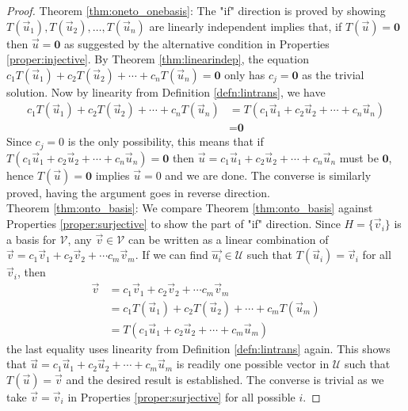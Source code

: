 \begin{proof}
Theorem \ref{thm:oneto_onebasis}: The "if" direction is proved by showing $T(\vec{u}_1), T(\vec{u}_2), \ldots, T(\vec{u}_n)$ are linearly independent implies that, if $T(\vec{u}) = \textbf{0}$ then $\vec{u} = \textbf{0}$ as suggested by the alternative condition in Properties \ref{proper:injective}. By Theorem \ref{thm:linearindep}, the equation $c_1T(\vec{u}_1) + c_2T(\vec{u}_2) + \cdots + c_nT(\vec{u}_n) = \textbf{0}$ only has $c_j = \textbf{0}$ as the trivial solution. Now by linearity from Definition \ref{defn:lintrans}, we have
\begin{align*}
c_1T(\vec{u}_1) + c_2T(\vec{u}_2) + \cdots + c_nT(\vec{u}_n) &= T(c_1\vec{u}_1 + c_2\vec{u}_2 + \cdots + c_n\vec{u}_n) \\
&= \textbf{0}    
\end{align*}
Since $c_j = 0$ is the only possibility, this means that if $T(c_1\vec{u}_1 + c_2\vec{u}_2 + \cdots + c_n\vec{u}_n) = \textbf{0}$ then $\vec{u} = c_1\vec{u}_1 + c_2\vec{u}_2 + \cdots + c_n\vec{u}_n$ must be $\textbf{0}$, hence $T(\vec{u}) = \textbf{0}$ implies $\vec{u} = 0$ and we are done. The converse is similarly proved,  having the argument goes in reverse direction. \\
Theorem \ref{thm:onto_basis}: We compare Theorem \ref{thm:onto_basis} against Properties \ref{proper:surjective} to show the part of "if" direction. Since $H = \{\vec{v}_i\}$ is a basis for $\mathcal{V}$, any $\vec{v} \in \mathcal{V}$ can be written as a linear combination of $\vec{v} = c_1\vec{v}_1 + c_2\vec{v}_2 + \cdots c_m\vec{v}_m$. If we can find $\vec{u_i} \in \mathcal{U}$ such that $T(\vec{u}_i) = \vec{v}_i$ for all $\vec{v}_i$, then
\begin{align*}
\vec{v} &= c_1\vec{v}_1 + c_2\vec{v}_2 + \cdots c_m\vec{v}_m \\
&= c_1T(\vec{u}_1) + c_2T(\vec{u}_2) + \cdots + c_mT(\vec{u}_m) \\
&= T(c_1\vec{u}_1 + c_2\vec{u}_2 + \cdots + c_m\vec{u}_m)
\end{align*}
the last equality uses linearity from Definition \ref{defn:lintrans} again. This shows that $\vec{u} = c_1\vec{u}_1 + c_2\vec{u}_2 + \cdots + c_m\vec{u}_m$ is readily one possible vector in $\mathcal{U}$ such that $T(\vec{u}) = \vec{v}$ and the desired result is established. The converse is trivial as we take $\vec{v} = \vec{v}_i$ in Properties \ref{proper:surjective} for all possible $i$.
\end{proof}

